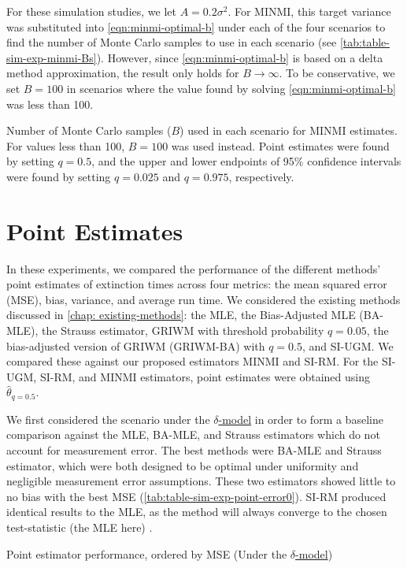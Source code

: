 For these simulation studies, we let $A = 0.2\sigma^2$. For MINMI, this target variance was substituted into \autoref{eqn:minmi-optimal-b} under each of the four scenarios to find the number of Monte Carlo samples to use in each scenario (see \autoref{tab:table-sim-exp-minmi-Bs}). However, since \autoref{eqn:minmi-optimal-b} is based on a delta method approximation, the result only holds for $B \rightarrow \infty$. To be conservative, we set $B=100$ in scenarios where the value found by solving \autoref{eqn:minmi-optimal-b} was less than 100. %
\begin{table}[ht]
    \centering
    \caption{Number of Monte Carlo samples ($B$) used in each scenario for MINMI estimates. For values less than 100, $B = 100$ was used instead. Point estimates were found by setting $q = 0.5$, and the upper and lower endpoints of 95\% confidence intervals were found by setting $q=0.025$ and $q=0.975$, respectively.}
    \vspace{4mm}
    
    \label{tab:table-sim-exp-minmi-Bs}
    \vspace{-4mm}
\end{table}

\section{Point Estimates}

In these experiments, we compared the performance of the different methods' point estimates of extinction times across four metrics: the mean squared error (MSE), bias, variance, and average run time. We considered the existing methods discussed in \autoref{chap: existing-methods}: the MLE, the Bias-Adjusted MLE (BA-MLE), the Strauss estimator, GRIWM with threshold probability $q=0.05$, the bias-adjusted version of GRIWM (GRIWM-BA) with $q=0.5$, and SI-UGM. We compared these against our proposed estimators MINMI and SI-RM. For the SI-UGM, SI-RM, and MINMI estimators, point estimates were obtained using $\hat\theta_{q=0.5}$.

We first considered the scenario under the \hyperref[model: no-measurement-error]{$\delta$-model} in order to form a baseline comparison against the MLE, BA-MLE, and Strauss estimators which do not account for measurement error. The best methods were BA-MLE and Strauss estimator, which were both designed to be optimal under uniformity and negligible measurement error assumptions. These two estimators showed little to no bias with the best MSE (\autoref{tab:table-sim-exp-point-error0}). SI-RM produced identical results to the MLE, as the method will always converge to the chosen test-statistic (the MLE here) \cite{Garthwaite1992}.
\begin{table}[ht]
    \centering
    \caption{Point estimator performance, ordered by MSE (Under the \hyperref[model: no-measurement-error]{$\delta$-model})}
    
    \label{tab:table-sim-exp-point-error0}
\end{table}

